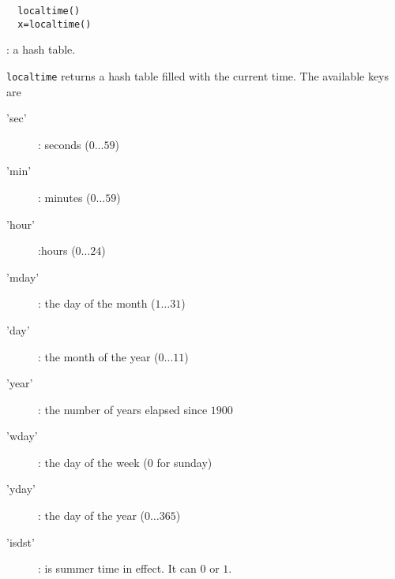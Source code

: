 \begin{mandesc}
\end{mandesc}

\begin{calling_sequence}
\begin{verbatim}
  localtime()
  x=localtime()  
\end{verbatim}
\end{calling_sequence}
\begin{parameters}
  \begin{varlist}
    : a hash table.
  \end{varlist}
\end{parameters}
\begin{mandescription}
  \verb!localtime! returns a hash table filled with the
  current time. The available keys are
  \begin{description}
  \item['sec'] : seconds ($0 \dots 59$)
  \item['min'] : minutes ($0 \dots 59$)
  \item['hour'] :hours ($0 \dots 24$)
  \item['mday'] : the day of the month ($1 \dots 31$)
  \item['day'] : the month of the year ($0 \dots 11$)
  \item['year'] : the number of years elapsed since $1900$
  \item['wday'] : the day of the week ($0$ for sunday)
  \item['yday'] : the day of the year ($0 \dots 365$)
  \item['isdst'] : is summer time in effect. It can $0$ or $1$.
  \end{description}
\end{mandescription} 


